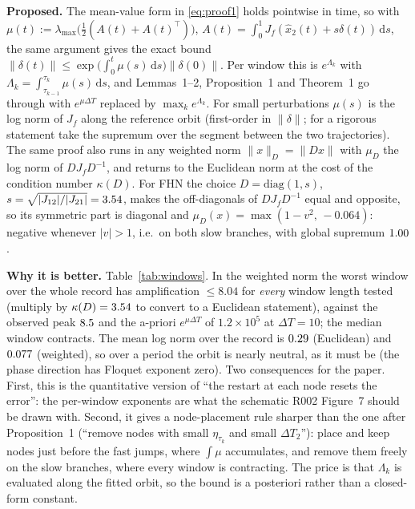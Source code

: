 \documentclass[10pt]{article}
\newcommand{\prop}[1]{\textcolor{blue!60!black}{\textbf{Proposed.}} #1}
\newcommand{\gain}[1]{\textcolor{green!45!black}{\textbf{Why it is better.}} #1}
\newcommand{\norm}[1]{\lVert #1\rVert}
\newcommand{\dd}{\,\mathrm{d}}
\begin{document}
\prop{} The mean-value form in \eqref{eq:proof1} holds pointwise in time, so with $\mu(t):=\lambda_{\max}\big(\tfrac12(A(t)+A(t)^\top)\big)$, $A(t)=\int_0^1 J_f(\hat x_2(t)+s\delta(t))\dd s$, the same argument gives the exact bound $\norm{\delta(t)}\le\exp\!\big(\int_0^t\mu(s)\dd s\big)\norm{\delta(0)}$. Per window this is $e^{\Lambda_k}$ with $\Lambda_k=\int_{\tau_{k-1}}^{\tau_k}\mu(s)\dd s$, and Lemmas~1--2, Proposition~1 and Theorem~1 go through with $e^{\mu\Delta T}$ replaced by $\max_k e^{\Lambda_k}$. For small perturbations $\mu(s)$ is the log norm of $J_f$ along the reference orbit (first-order in $\norm{\delta}$; for a rigorous statement take the supremum over the segment between the two trajectories). The same proof also runs in any weighted norm $\norm{x}_D=\norm{Dx}$ with $\mu_D$ the log norm of $DJ_fD^{-1}$, and returns to the Euclidean norm at the cost of the condition number $\kappa(D)$. For FHN the choice $D=\mathrm{diag}(1,s)$, $s=\sqrt{|J_{12}|/|J_{21}|}=3.54$, makes the off-diagonals of $DJ_fD^{-1}$ equal and opposite, so its symmetric part is diagonal and $\mu_D(x)=\max(1-v^2,\,-0.064)$: negative whenever $|v|>1$, i.e.\ on both slow branches, with global supremum $1.00$.

\gain{} Table~\ref{tab:windows}. In the weighted norm the worst window over the whole record has amplification $\le 8.04$ for \emph{every} window length tested (multiply by $\kappa(D)=\cweights$ to convert to a Euclidean statement), against the observed peak $8.5$ and the a-priori $e^{\mu\Delta T}$ of $1.2\times10^5$ at $\Delta T=10$; the median window contracts. The mean log norm over the record is $0.29$ (Euclidean) and $0.077$ (weighted), so over a period the orbit is nearly neutral, as it must be (the phase direction has Floquet exponent zero). Two consequences for the paper. First, this is the quantitative version of ``the restart at each node resets the error'': the per-window exponents are what the schematic R002 Figure~7 should be drawn with. Second, it gives a node-placement rule sharper than the one after Proposition~1 (``remove nodes with small $\eta_{\tau_k}$ and small $\Delta T_2$''): place and keep nodes just before the fast jumps, where $\int\mu$ accumulates, and remove them freely on the slow branches, where every window is contracting. The price is that $\Lambda_k$ is evaluated along the fitted orbit, so the bound is a posteriori rather than a closed-form constant.

\begin{table}[t]\centering\small
\caption{Per-window amplification along the true FHN orbit ($\Delta t=1$, $\cNobs$ data, windows aligned to $t_0$). ``Worst'' and ``median'' are $\max_k$ and median$_k$ of $e^{\Lambda_k}$ over the windows of that length; ``contracting'' is the share of windows with $\Lambda^D_k<0$. Weighted-norm values convert to Euclidean statements by a factor at most $\kappa(D)=\cweights$. Source: \texttt{analysis/results/window\_exponents.csv}, \texttt{window\_exponents\_D.csv}.}\label{tab:windows}

\end{table}
\end{document}
